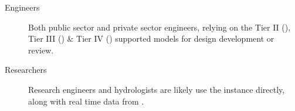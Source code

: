 \documentclass[letterpaper,10pt,english]{sphinxmanual}
\begin{document}
\begin{description}
\item[{Engineers}] \leavevmode
\sphinxAtStartPar
Both public sector and private sector engineers, relying on the {\hyperref[\detokenize{glossary:term-REON-WM}]{}} Tier II ({\hyperref[\detokenize{glossary:term-HEC-RAS}]{}}), Tier III ({\hyperref[\detokenize{glossary:term-HEC-HMS}]{}}) \& Tier IV ({\hyperref[\detokenize{glossary:term-SWMM}]{}}) supported models for design development or review.

\item[{Researchers}] \leavevmode
\sphinxAtStartPar
Research engineers and hydrologists are likely use the {\hyperref[\detokenize{glossary:term-REON-WM}]{}} {\hyperref[\detokenize{glossary:term-WRF-Hydro}]{}} instance directly, along with real time data from {\hyperref[\detokenize{glossary:term-RTHS.us}]{}}.

\end{description}
\end{document}
